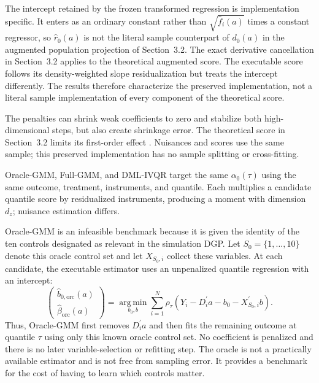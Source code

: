 The intercept retained by the frozen transformed regression is implementation specific. It enters as an ordinary constant rather than $\sqrt{\widehat f_i(a)}$ times a constant regressor, so $\widehat r_0(a)$ is not the literal sample counterpart of $d_0(a)$ in the augmented population projection of Section~3.2. The exact derivative cancellation in Section~3.2 applies to the theoretical augmented score. The executable score follows its density-weighted slope residualization but treats the intercept differently. The results therefore characterize the preserved implementation, not a literal sample implementation of every component of the theoretical score.

The penalties can shrink weak coefficients to zero and stabilize both high-dimensional steps, but also create shrinkage error. The theoretical score in Section~3.2 limits its first-order effect \parencite{chernozhukov_et_al_2018}. Nuisances and scores use the same sample; this preserved implementation has no sample splitting or cross-fitting.

Oracle-GMM, Full-GMM, and DML-IVQR target the same $\alpha_0(\tau)$ using the same outcome, treatment, instruments, and quantile. Each multiplies a candidate quantile score by residualized instruments, producing a moment with dimension $d_z$; nuisance estimation differs.

Oracle-GMM is an infeasible benchmark because it is given the identity of the ten controls designated as relevant in the simulation DGP. Let $S_0=\{1,\ldots,10\}$ denote this oracle control set and let $X_{S_0,i}$ collect these variables. At each candidate, the executable estimator uses an unpenalized quantile regression with an intercept:
\begin{equation}
    \begin{pmatrix}
        \widehat b_{0,\mathrm{orc}}(a)\\
        \widehat\beta_{\mathrm{orc}}(a)
    \end{pmatrix}
    =
    \operatorname*{arg\,min}_{b_0,b}
    \sum_{i=1}^{N}
    \rho_{\tau}\!\left(
        Y_i-D_i^{\prime}a-b_0-X_{S_0,i}^{\prime}b
    \right).
    \label{eq:oracle-beta}
\end{equation}
Thus, Oracle-GMM first removes $D_i^{\prime}a$ and then fits the remaining outcome at quantile $\tau$ using only this known oracle control set. No coefficient is penalized and there is no later variable-selection or refitting step. The oracle is not a practically available estimator and is not free from sampling error. It provides a benchmark for the cost of having to learn which controls matter.

